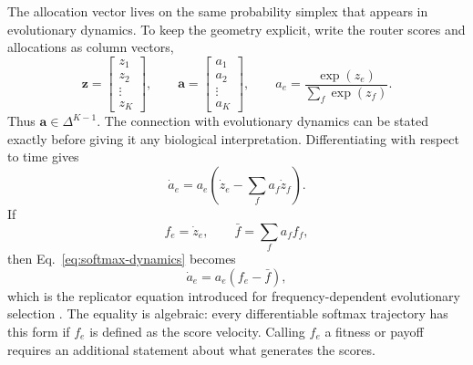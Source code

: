 \documentclass[11pt]{article}
\begin{document}
The allocation vector lives on the same probability simplex that appears in evolutionary dynamics. To keep the geometry explicit, write the router scores and allocations as column vectors,
\begin{equation}
\mathbf z
=
\begin{bmatrix}
z_1\\
z_2\\
\vdots\\
z_K
\end{bmatrix},
\qquad
\mathbf a
=
\begin{bmatrix}
a_1\\
a_2\\
\vdots\\
a_K
\end{bmatrix},
\qquad
a_e
=
\frac{\exp(z_e)}{\sum_f\exp(z_f)}.
\label{eq:router-vectors}
\end{equation}
Thus $\mathbf a\in\Delta^{K-1}$. The connection with evolutionary dynamics can be stated exactly before giving it any biological interpretation. Differentiating with respect to time gives
\begin{equation}
\dot a_e
=
a_e
\left(
\dot z_e
-
\sum_f a_f\dot z_f
\right).
\label{eq:softmax-dynamics}
\end{equation}
If
\begin{equation}
f_e
=
\dot z_e,
\qquad
\bar f
=
\sum_f a_f f_f,
\end{equation}
then Eq.~\eqref{eq:softmax-dynamics} becomes
\begin{equation}
\dot a_e
=
a_e(f_e-\bar f),
\label{eq:replicator}
\end{equation}
which is the replicator equation introduced for frequency-dependent evolutionary selection \cite{taylor1978}. The equality is algebraic: every differentiable softmax trajectory has this form if $f_e$ is defined as the score velocity. Calling $f_e$ a fitness or payoff requires an additional statement about what generates the scores.
\end{document}

